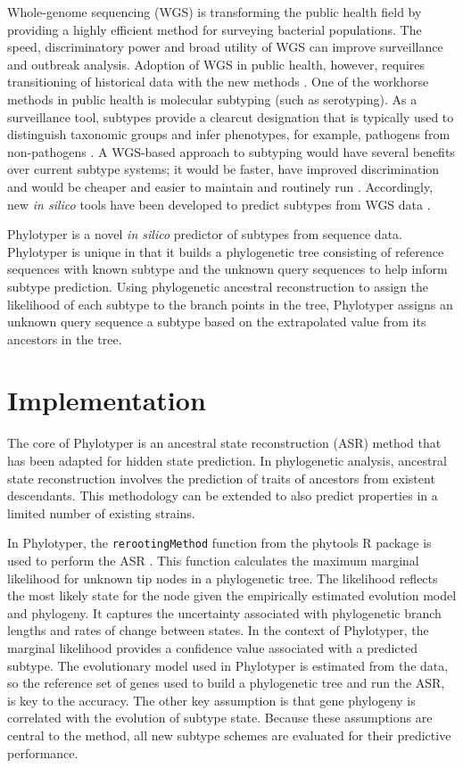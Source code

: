 \documentclass{bioinfo}
\begin{document}
Whole-genome sequencing (WGS) is transforming the public health field by providing a highly efficient method for surveying bacterial populations.
The speed, discriminatory power and broad utility of WGS can improve surveillance and outbreak analysis.
Adoption of WGS in public health, however, requires transitioning of historical data with the new methods \citep{Jenkins2015}.
One of the workhorse methods in public health is molecular subtyping (such as serotyping).
As a surveillance tool, subtypes provide a clearcut designation that is typically used to distinguish taxonomic groups and infer phenotypes, for example, pathogens from non-pathogens \citep{Jenkins2015}.
A WGS-based approach to subtyping would have several benefits over current subtype systems; it would be faster, have improved discrimination and would be cheaper and easier to maintain and routinely run \citep{Jenkins2015}.
Accordingly, new \textit{in silico} tools have been developed to predict subtypes from WGS data \citep{Inouye2014,Joensen2015,Ingle2016,Lindsey2016,CARRILLO2016}.

Phylotyper is a novel \textit{in silico} predictor of subtypes from sequence data. 
Phylotyper is unique in that it builds a phylogenetic tree consisting of reference sequences with known subtype and the unknown query sequences to help inform subtype prediction. 
Using phylogenetic ancestral reconstruction to assign the likelihood of each subtype to the branch points in the tree, Phylotyper assigns an unknown query sequence a subtype based on the extrapolated value from its ancestors in the tree.

\section{Implementation}

The core of Phylotyper is an ancestral state reconstruction (ASR) method that has been adapted for hidden state prediction.
In phylogenetic analysis, ancestral state reconstruction involves the prediction of traits of ancestors from existent descendants.
This methodology can be extended to also predict properties in a limited number of existing strains.

In Phylotyper, the \texttt{rerootingMethod} function from the phytools R package is used to perform the ASR \citep{Revell2011}.
This function calculates the maximum marginal likelihood for unknown tip nodes in a phylogenetic tree.
The likelihood reflects the most likely state for the node given the empirically estimated evolution model and phylogeny.
It captures the uncertainty associated with phylogenetic branch lengths and rates of change between states.
In the context of Phylotyper, the marginal likelihood provides a confidence value associated with a predicted subtype.
The evolutionary model used in Phylotyper is estimated from the data, so the reference set of genes used to build a phylogenetic tree and run the ASR, is key to the accuracy.
The other key assumption is that gene phylogeny is correlated with the evolution of subtype state.
Because these assumptions are central to the method, all new subtype schemes are evaluated for their predictive performance.
\end{document}
